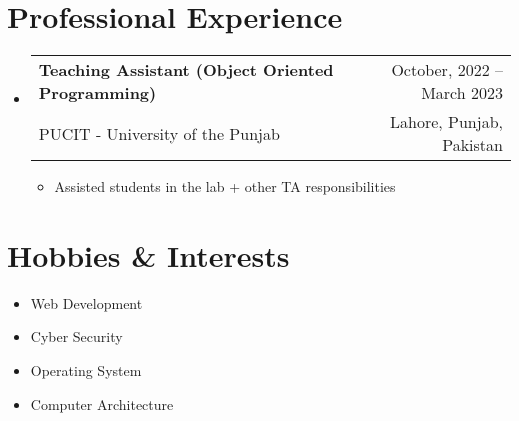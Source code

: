 \documentclass[letterpaper,11pt]{article}
\makeatletter
\newcommand{\resumeItem}[1]{
  \item{
    {#1 \vspace{-4pt}}
  }
}
\newcommand{\resumeSubheading}[4]{
  \vspace{-2pt}\item
    \begin{tabular*}{0.97\textwidth}[t]{l@{\extracolsep{\fill}}r}
      \textbf{#1} & #2 \\
      {\small #3} & {\small #4} \\
    \end{tabular*}\vspace{-10pt}
}
\newcommand{\resumeSubHeadingListStart}{\begin{itemize}[leftmargin=0.15in, label={}]}
\newcommand{\resumeSubHeadingListEnd}{\end{itemize}}
\newcommand{\resumeItemListStart}{\begin{itemize}}
\newcommand{\resumeItemListEnd}{\end{itemize}\vspace{-2pt}}
\makeatother
\begin{document}
\section{Professional Experience}
\resumeSubHeadingListStart

    \resumeSubheading
        {Teaching Assistant (Object Oriented Programming)}{October, 2022 -- March 2023}
        {PUCIT - University of the Punjab}{Lahore, Punjab, Pakistan}
        \resumeItemListStart
            \resumeItem{Assisted students in the lab + other TA responsibilities}
          \resumeItemListEnd

\resumeSubHeadingListEnd


\section{Hobbies \& Interests}
\begin{itemize}[leftmargin=0.15in, label={}]
    \normalsize{\item{
        \resumeItemListStart
            \resumeItem{Web Development}
            \resumeItem{Cyber Security}
            \resumeItem{Operating System}
            \resumeItem{Computer Architecture}
        \resumeItemListEnd
    }}
    
 \end{itemize}
\end{document}
